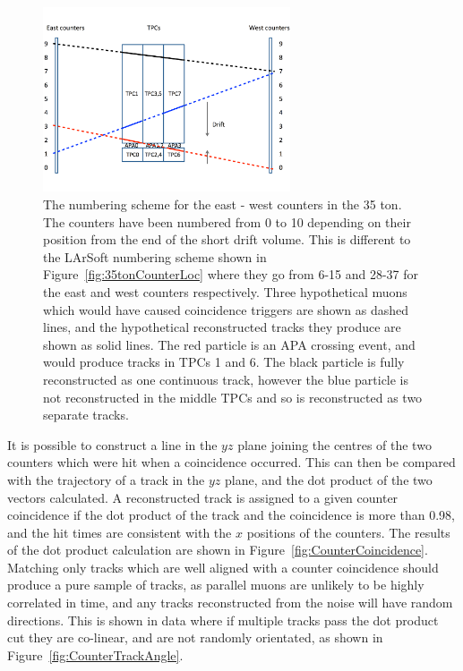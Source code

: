 \begin{figure}
  \centering
  \includegraphics[width=0.65\textwidth]{CounterSchematic}
  \caption[The numbering scheme for the east - west counters in the 35 ton]
          {The numbering scheme for the east - west counters in the 35 ton. The counters have been numbered from 0 to 10 depending on their position from the end of the short drift volume. This is different to the LArSoft numbering scheme shown in Figure~\ref{fig:35tonCounterLoc} where they go from 6-15 and 28-37 for the east and west counters respectively. Three hypothetical muons which would have caused coincidence triggers are shown as dashed lines, and the hypothetical reconstructed tracks they produce are shown as solid lines. The red particle is an APA crossing event, and would produce tracks in TPCs 1 and 6. The black particle is fully reconstructed as one continuous track, however the blue particle is not reconstructed in the middle TPCs and so is reconstructed as two separate tracks.}
  \label{fig:EWCounters}
\end{figure}

It is possible to construct a line in the $yz$ plane joining the centres of the two counters which were hit when a coincidence occurred. This can then be compared with the trajectory of a track in the $yz$ plane, and the dot product of the two vectors calculated. A reconstructed track is assigned to a given counter coincidence if the dot product of the track and the coincidence is more than 0.98, and the hit times are consistent with the $x$ positions of the counters. The results of the dot product calculation are shown in Figure~\ref{fig:CounterCoincidence}. Matching only tracks which are well aligned with a counter coincidence should produce a pure sample of tracks, as parallel muons are unlikely to be highly correlated in time, and any tracks reconstructed from the noise will have random directions. This is shown in data where if multiple tracks pass the dot product cut they are co-linear, and are not randomly orientated, as shown in Figure~\ref{fig:CounterTrackAngle}. \\

